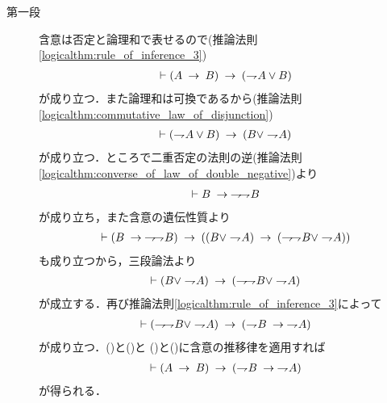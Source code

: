 	\begin{prf}\mbox{}
		\begin{description}
			\item[第一段]
				含意は否定と論理和で表せるので(推論法則\ref{logicalthm:rule_of_inference_3})
				\begin{align}
					\vdash (A \rarrow B) \rarrow (\negation A \vee B)
					\label{eq:thm_contraposition_is_true_1}
				\end{align}
				が成り立つ．また論理和は可換であるから(推論法則\ref{logicalthm:commutative_law_of_disjunction})
				\begin{align}
					\vdash (\negation A \vee B) \rarrow (B \vee \negation A)
					\label{eq:thm_contraposition_is_true_2}
				\end{align}
				が成り立つ．ところで二重否定の法則の逆(推論法則\ref{logicalthm:converse_of_law_of_double_negative})より
				\begin{align}
					\vdash B \hspace{0.25em}\rightarrow\hspace{0.25em} \rightharpoondown\hspace{-0.25em} \rightharpoondown\hspace{-0.25em} B
				\end{align}
				が成り立ち，また含意の遺伝性質より
				\begin{align}
					\vdash (B \hspace{0.25em}\rightarrow\hspace{0.25em} \rightharpoondown\hspace{-0.25em} \rightharpoondown\hspace{-0.25em} B)
					\hspace{0.25em}\rightarrow\hspace{0.25em} ((B \vee \rightharpoondown\hspace{-0.25em} A) 
					\hspace{0.25em}\rightarrow\hspace{0.25em} (\rightharpoondown\hspace{-0.25em} \rightharpoondown\hspace{-0.25em} B \vee \rightharpoondown\hspace{-0.25em} A))
				\end{align}
				も成り立つから，三段論法より
				\begin{align}
					\vdash (B \vee \negation A) 
					\rarrow (\negation \negation B \vee \negation A)
					\label{eq:thm_contraposition_is_true_3}
				\end{align}
				が成立する．再び推論法則\ref{logicalthm:rule_of_inference_3}によって
				\begin{align}
					\vdash (\negation \negation B \vee \negation A)
					\rarrow (\negation B \rarrow \negation A)
					\label{eq:thm_contraposition_is_true_4}
				\end{align}
				が成り立つ．()と()と
				()と()に含意の推移律を適用すれば
				\begin{align}
					\vdash (A \hspace{0.25em}\rightarrow\hspace{0.25em} B) \hspace{0.25em}\rightarrow\hspace{0.25em} (\rightharpoondown\hspace{-0.25em} B \hspace{0.25em}\rightarrow\hspace{0.25em} \rightharpoondown\hspace{-0.25em} A)
				\end{align}
				が得られる．
				

\end{description}
\end{prf}
